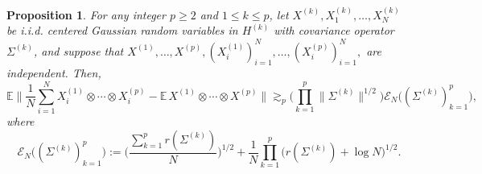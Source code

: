 \documentclass[10pt,a4paper]{amsart}
\newtheorem{proposition}{Proposition}
\newcommand{\E}{\mathbb{E}}
\begin{document}
\begin{proposition}\label{prop:lowerbound} For any integer $p\ge 2$ and $1 \leq k \leq p$, let $X^{(k)}, X_1^{(k)}, \ldots, X_N^{(k)}$ be i.i.d. centered Gaussian random variables in $H^{(k)}$ with covariance operator $\Sigma^{(k)}$, and suppose that $X^{(1)},\ldots, X^{(p)}, (X^{(1)}_i)_{i=1}^{N},\ldots,(X^{(p)}_i)_{i=1}^N,$ are independent. Then,
\[
\E \bigg\|\frac{1}{N} \sum_{i=1}^N X_i^{(1)} \otimes \cdots \otimes X_i^{(p)}-\E\, X^{(1)} \otimes \cdots \otimes X^{(p)}\bigg\| \gtrsim_p\bigg(\prod_{k=1}^p\|\Sigma^{(k)}\|^{1 / 2}\bigg)\mathscr{E}_N\big((\Sigma^{(k)})_{k=1}^p\big),
\]
where
\[
\mathscr{E}_N\big((\Sigma^{(k)})_{k=1}^p\big):= \bigg(\frac{\sum_{k=1}^p r(\Sigma^{(k)})}{N}\bigg)^{1/2}+\frac{1}{N}\prod_{k= 1}^{p}\Big(r(\Sigma^{(k)})+\log N\Big)^{1/2}.
\]
\end{proposition}
\end{document}
